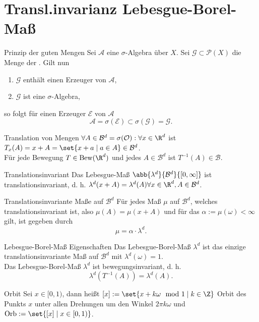 \section*{Transl.invarianz Lebesgue-Borel-Maß}

\begin{karte}{Prinzip der guten Mengen}
	Sei \( \mathcal{A} \) eine \(\sigma\)-Algebra über \(X\). Sei \( \mathcal{G} \subset \mathcal{P}(X) \) 
	die Menge der . Gilt nun 
	\begin{enumerate}
		\item \( \mathcal{G} \) enthält einen Erzeuger von \(\mathcal{A}\),
		\item \( \mathcal{G} \) ist eine \(\sigma\)-Algebra,
	\end{enumerate}
	so folgt für einen Erzeuger \( \mathcal{E} \) von \( \mathcal{A} \) 
	\[ \mathcal{A} = \sigma(\mathcal{E}) \subset \sigma(\mathcal{G}) = \mathcal{G}. \]
\end{karte}
\begin{karte}{Translation von Mengen}
	\( \forall A\in \mathcal{B}^d = \sigma(\mathcal{O}): \forall x\in \R^d \) ist 
	\( T_x(A) = x + A = \set{ x + a \;|\; a\in A } \in \mathcal{B}^d \).\\
	Für jede Bewegung \( T\in \mathrm{Bew}(\R^d) \) und jedes \(A \in \mathcal{B}^d \) ist \( T^{-1}(A) \in \mathcal{B} \).
\end{karte}
\begin{karte}{Translationsinvariant}
	Das Lebesgue-Maß \( \abb{\lambda^d}{\mathcal{B}^d}{[0,\infty]} \) ist 
	translationsinvariant, d. h. \( \lambda^d(x+A) = \lambda^d(A) \forall x\in \R^d, A\in \mathcal{B}^d \).
\end{karte}
\begin{karte}{Translationsinvariante Maße auf \(\mathcal{B}^d\)}
	Für jedes Maß \( \mu \) auf \(\mathcal{B}^d\), welches translationsinvariant ist, also 
	\( \mu(A) = \mu(x + A) \) und für das \( \alpha := \mu(\omega) < \infty \) gilt, ist gegeben durch 
	\[ \mu= \alpha \cdot \lambda^d. \]
\end{karte}
\begin{karte}{Lebesgue-Borel-Maß Eigenschaften}
	Das Lebesgue-Borel-Maß \(\lambda^d \) ist das einzige translationsinvariante Maß auf \( \mathcal{B}^d \) 
	mit \( \lambda^d(\omega) = 1 \).\\
	Das Lebesgue-Borel-Maß \( \lambda^d \) ist bewegungsinvariant, d. h. 
	\[ \lambda^d(T^{-1}(A)) = \lambda^d(A). \]
\end{karte}
\begin{karte}{Orbit}
	Sei \( x\in [0,1) \), dann heißt \( [x] := \set{ x + k \omega \mod 1 \;|\; k\in \Z } \) Orbit des 
	Punkts \(x\) unter allen Drehungen um den Winkel \( 2\pi k \omega \) und \( \mathrm{Orb} := \set{ [x] \;|\; x\in [0,1) } \).
\end{karte}
